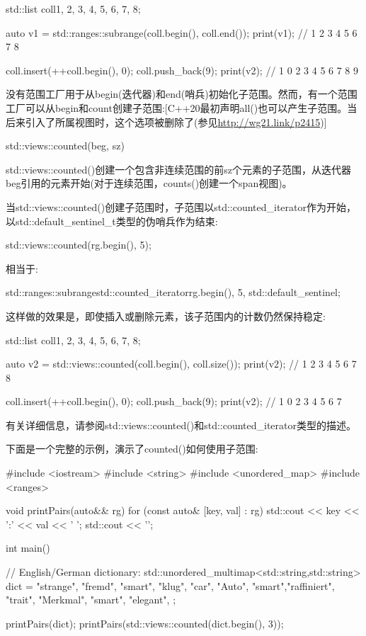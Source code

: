 \begin{cpp}
std::list coll{1, 2, 3, 4, 5, 6, 7, 8};

auto v1 = std::ranges::subrange(coll.begin(), coll.end());
print(v1); // 1 2 3 4 5 6 7 8

coll.insert(++coll.begin(), 0);
coll.push_back(9);
print(v2); // 1 0 2 3 4 5 6 7 8 9
\end{cpp}


没有范围工厂用于从begin(迭代器)和end(哨兵)初始化子范围。然而，有一个范围工厂可以从begin和count创建子范围:[C++20最初声明all()也可以产生子范围。当后来引入了所属视图时，这个选项被删除了(参见\url{http://wg21.link/p2415})]

\begin{cpp}
std::views::counted(beg, sz)
\end{cpp}

std::views::counted()创建一个包含非连续范围的前sz个元素的子范围，从迭代器beg引用的元素开始(对于连续范围，counts()创建一个span视图)。

当std::views::counted()创建子范围时，子范围以std::counted\_iterator作为开始，以std::default\_sentinel\_t类型的伪哨兵作为结束:

\begin{cpp}
std::views::counted(rg.begin(), 5);
\end{cpp}

相当于:

\begin{cpp}
std::ranges::subrange{std::counted_iterator{rg.begin(), 5},
	std::default_sentinel};
\end{cpp}

这样做的效果是，即使插入或删除元素，该子范围内的计数仍然保持稳定:

\begin{cpp}
std::list coll{1, 2, 3, 4, 5, 6, 7, 8};

auto v2 = std::views::counted(coll.begin(), coll.size());
print(v2); // 1 2 3 4 5 6 7 8

coll.insert(++coll.begin(), 0);
coll.push_back(9);
print(v2); // 1 0 2 3 4 5 6 7
\end{cpp}

有关详细信息，请参阅std::views::counted()和std::counted\_iterator类型的描述。

下面是一个完整的示例，演示了counted()如何使用子范围:


\begin{cpp}
#include <iostream>
#include <string>
#include <unordered_map>
#include <ranges>

void printPairs(auto&& rg)
{
	for (const auto& [key, val] : rg) {
		std::cout << key << ':' << val << ' ';
	}
	std::cout << '\n';
}

int main()
{
	// English/German dictionary:
	std::unordered_multimap<std::string,std::string> dict = {
		{"strange", "fremd"},
		{"smart", "klug"},
		{"car", "Auto"},
		{"smart","raffiniert"},
		{"trait", "Merkmal"},
		{"smart", "elegant"},
	};
	
	printPairs(dict);
	printPairs(std::views::counted(dict.begin(), 3));
}
\end{cpp}

